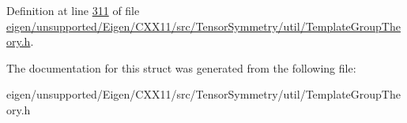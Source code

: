 Definition at line \hyperlink{eigen_2unsupported_2_eigen_2_c_x_x11_2src_2_tensor_symmetry_2util_2_template_group_theory_8h_source_l00311}{311} of file \hyperlink{eigen_2unsupported_2_eigen_2_c_x_x11_2src_2_tensor_symmetry_2util_2_template_group_theory_8h_source}{eigen/unsupported/\+Eigen/\+C\+X\+X11/src/\+Tensor\+Symmetry/util/\+Template\+Group\+Theory.\+h}.



The documentation for this struct was generated from the following file\+:\begin{DoxyCompactItemize}
\item 
eigen/unsupported/\+Eigen/\+C\+X\+X11/src/\+Tensor\+Symmetry/util/\+Template\+Group\+Theory.\+h\end{DoxyCompactItemize}
